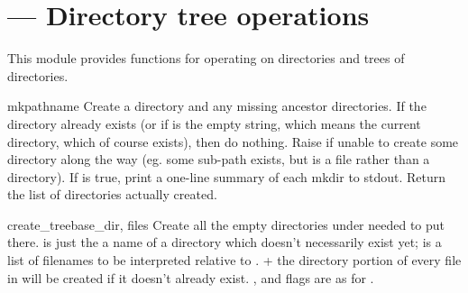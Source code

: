 \documentclass{manual}
\begin{document}
\section{ --- Directory tree operations}

This module provides functions for operating on directories and trees
of directories.

\begin{funcdesc}{mkpath}{name}
Create a directory and any missing ancestor directories.  If the
directory already exists (or if  is the empty string, which
means the current directory, which of course exists), then do
nothing.  Raise  if unable to create some
directory along the way (eg. some sub-path exists, but is a file
rather than a directory).  If  is true, print a one-line
summary of each mkdir to stdout.  Return the list of directories
actually created.
\end{funcdesc}

\begin{funcdesc}{create_tree}{base_dir, files}
Create all the empty directories under  needed to
put  there.   is just the a name of a directory
which doesn't necessarily exist yet;  is a list of filenames
to be interpreted relative to .   + the
directory portion of every file in  will be created if it
doesn't already exist.  ,  and  flags 
are as for .
\end{funcdesc}
\end{document}
